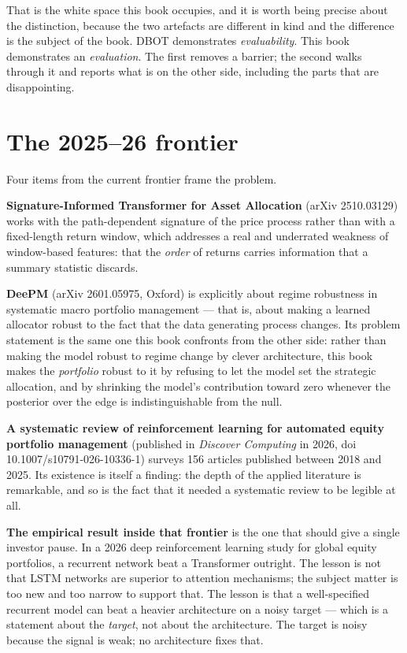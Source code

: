 That is the white space this book occupies, and it is worth being precise
about the distinction, because the two artefacts are different in kind and
the difference is the subject of the book. DBOT demonstrates
\emph{evaluability}. This book demonstrates an \emph{evaluation}. The
first removes a barrier; the second walks through it and reports what is on
the other side, including the parts that are disappointing.

\section{The 2025--26 frontier}

Four items from the current frontier frame the problem.

\textbf{Signature-Informed Transformer for Asset Allocation} (arXiv
2510.03129) works with the path-dependent signature of the price process
rather than with a fixed-length return window, which addresses a real and
underrated weakness of window-based features: that the \emph{order} of
returns carries information that a summary statistic discards.

\textbf{DeePM} (arXiv 2601.05975, Oxford) is explicitly about regime
robustness in systematic macro portfolio management --- that is, about
making a learned allocator robust to the fact that the data generating
process changes. Its problem statement is the same one this book confronts
from the other side: rather than making the model robust to regime change
by clever architecture, this book makes the \emph{portfolio} robust to it
by refusing to let the model set the strategic allocation, and by shrinking
the model's contribution toward zero whenever the posterior over the edge
is indistinguishable from the null.

\textbf{A systematic review of reinforcement learning for automated equity
portfolio management} (published in \emph{Discover Computing} in 2026,
doi 10.1007/s10791-026-10336-1) surveys 156 articles published between 2018
and 2025. Its existence is itself a finding: the depth of the applied
literature is remarkable, and so is the fact that it needed a systematic
review to be legible at all.

\textbf{The empirical result inside that frontier} is the one that should
give a single investor pause. In a 2026 deep reinforcement learning study
for global equity portfolios, a recurrent network beat a Transformer
outright. The lesson is not that LSTM networks are superior to attention
mechanisms; the subject matter is too new and too narrow to support that.
The lesson is that a well-specified recurrent model can beat a
heavier architecture on a noisy target --- which is a statement about the
\emph{target}, not about the architecture. The target is noisy because the
signal is weak; no architecture fixes that.

